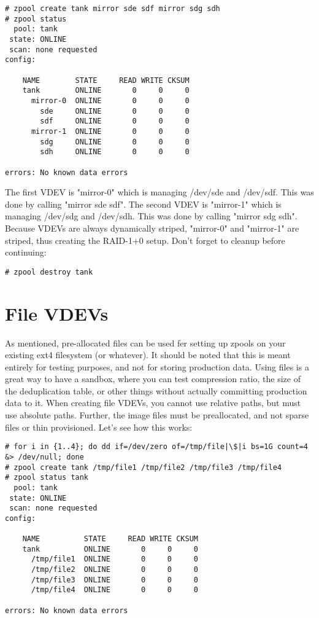 \documentclass[landscape]{book}
\begin{document}
\begin{lstlisting}
# zpool create tank mirror sde sdf mirror sdg sdh
# zpool status
  pool: tank
 state: ONLINE
 scan: none requested
config:

    NAME        STATE     READ WRITE CKSUM
    tank        ONLINE       0     0     0
      mirror-0  ONLINE       0     0     0
        sde     ONLINE       0     0     0
        sdf     ONLINE       0     0     0
      mirror-1  ONLINE       0     0     0
        sdg     ONLINE       0     0     0
        sdh     ONLINE       0     0     0

errors: No known data errors
\end{lstlisting}

The first VDEV is "mirror-0" which is managing /dev/sde and /dev/sdf. This was
done by calling "mirror sde sdf". The second VDEV is "mirror-1" which is
managing /dev/sdg and /dev/sdh. This was done by calling "mirror sdg sdh".
Because VDEVs are always dynamically striped, "mirror-0" and "mirror-1" are
striped, thus creating the RAID-1+0 setup. Don't forget to cleanup before
continuing:

\begin{lstlisting}
# zpool destroy tank
\end{lstlisting}

\section{File VDEVs}
As mentioned, pre-allocated files can be used fer setting up zpools on your
existing ext4 filesystem (or whatever). It should be noted that this is meant
entirely for testing purposes, and not for storing production data. Using files
is a great way to have a sandbox, where you can test compression ratio, the
size of the deduplication table, or other things without actually committing
production data to it. When creating file VDEVs, you cannot use relative paths,
but must use absolute paths. Further, the image files must be preallocated, and
not sparse files or thin provisioned. Let's see how this works:

\begin{lstlisting}
# for i in {1..4}; do dd if=/dev/zero of=/tmp/file|\$|i bs=1G count=4 &> /dev/null; done
# zpool create tank /tmp/file1 /tmp/file2 /tmp/file3 /tmp/file4
# zpool status tank
  pool: tank
 state: ONLINE
 scan: none requested
config:

    NAME          STATE     READ WRITE CKSUM
    tank          ONLINE       0     0     0
      /tmp/file1  ONLINE       0     0     0
      /tmp/file2  ONLINE       0     0     0
      /tmp/file3  ONLINE       0     0     0
      /tmp/file4  ONLINE       0     0     0

errors: No known data errors
\end{lstlisting}
\end{document}
